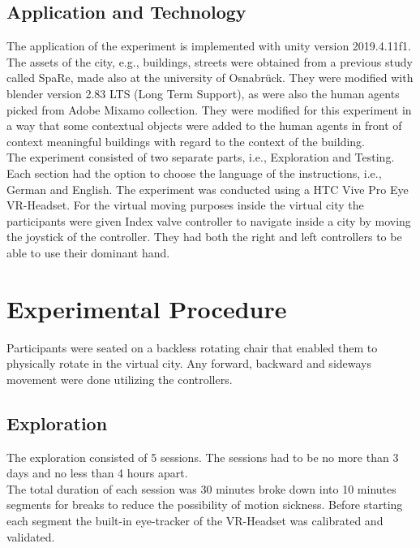 
\subsection{Application and Technology}

The application of the experiment is implemented with unity version 2019.4.11f1. The assets of the city, e.g., buildings, streets were obtained from a previous study called SpaRe, made also at the university of Osnabrück. They were modified with blender version 2.83 LTS (Long Term Support), as were also the human agents picked from Adobe Mixamo collection. They were modified for this experiment in a way that some contextual objects were added to the human agents in front of context meaningful buildings with regard to the context of the building. \\
The experiment consisted of two separate parts, i.e., Exploration and Testing.  Each section had the option to choose the language of the instructions, i.e., German and English. The experiment was conducted using a HTC Vive Pro Eye VR-Headset. For the virtual moving purposes inside the virtual city the participants were given Index valve controller to navigate inside a city by moving the joystick of the controller. They had both the right and left controllers to be able to use their dominant hand.

\section{Experimental Procedure}

Participants were seated on a backless rotating chair that enabled them to physically rotate in the virtual city. Any forward, backward and sideways movement were done utilizing the controllers.

\subsection{Exploration}

The exploration consisted of 5 sessions. The sessions had to be no more than 3 days and no less than 4 hours apart. \\
The total duration of each session was 30 minutes broke down into 10 minutes segments for breaks to reduce the possibility of motion sickness. Before starting each segment the built-in eye-tracker of the VR-Headset was calibrated and validated. \\

